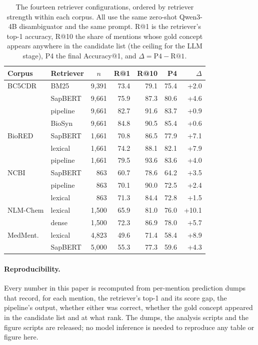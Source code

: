 \documentclass[11pt]{article}
\makeatletter
\newcommand{\acc}{Accuracy@1}
\makeatother
\begin{document}
\begin{table}[t]
\centering\footnotesize
\setlength{\tabcolsep}{2.6pt}
\begin{tabular}{llrrrrr}
\toprule
Corpus & Retriever & \multicolumn{1}{c}{$n$} & R@1 & R@10 & P4 & $\Delta$ \\
\midrule
BC5CDR & BM25 & 9{,}391 & 73.4 & 79.1 & 75.4 & +2.0 \\
 & SapBERT & 9{,}661 & 75.9 & 87.3 & 80.6 & +4.6 \\
 & pipeline & 9{,}661 & 82.7 & 91.6 & 83.7 & +0.9 \\
 & BioSyn & 9{,}661 & 84.8 & 90.5 & 85.4 & +0.6 \\
\addlinespace[2pt]
BioRED & SapBERT & 1{,}661 & 70.8 & 86.5 & 77.9 & +7.1 \\
 & lexical & 1{,}661 & 74.2 & 88.1 & 82.1 & +7.9 \\
 & pipeline & 1{,}661 & 79.5 & 93.6 & 83.6 & +4.0 \\
\addlinespace[2pt]
NCBI & SapBERT & 863 & 60.7 & 78.6 & 64.2 & +3.5 \\
 & pipeline & 863 & 70.1 & 90.0 & 72.5 & +2.4 \\
 & lexical & 863 & 71.3 & 84.4 & 72.8 & +1.5 \\
\addlinespace[2pt]
NLM-Chem & lexical & 1{,}500 & 65.9 & 81.0 & 76.0 & +10.1 \\
 & dense & 1{,}500 & 72.3 & 86.9 & 78.0 & +5.7 \\
\addlinespace[2pt]
MedMent. & lexical & 4{,}823 & 49.6 & 71.4 & 58.4 & +8.9 \\
 & SapBERT & 5{,}000 & 55.3 & 77.3 & 59.6 & +4.3 \\
\bottomrule
\end{tabular}
\caption{The fourteen retriever configurations, ordered by retriever strength within
each corpus. All use the same zero-shot Qwen3-4B disambiguator and the same prompt.
R@1 is the retriever's top-1 accuracy, R@10 the share of mentions whose gold concept
appears anywhere in the candidate list (the ceiling for the LLM stage), P4 the final
\acc{}, and $\Delta = \text{P4}-\text{R@1}$.}
\label{tab:runs}
\end{table}

\paragraph{Reproducibility.}
Every number in this paper is recomputed from per-mention prediction dumps that record,
for each mention, the retriever's top-1 and its score gap, the pipeline's output,
whether either was correct, whether the gold concept appeared in the candidate list
and at what rank. The dumps, the analysis scripts and the figure scripts are released;
no model inference is needed to reproduce any table or figure here.
\end{document}
